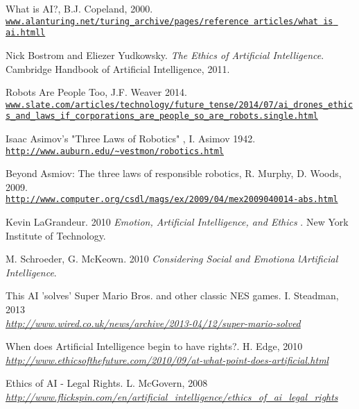 \documentclass[article]{IEEEtran}
\begin{document}
\begin{thebibliography}{9}

What is AI?, B.J. Copeland, 2000.
\\\texttt{\url{www.alanturing.net/turing_archive/pages/reference articles/what is ai.htmll}}

Nick Bostrom and Eliezer Yudkowsky. 
\textit{The Ethics of Artificial Intelligence}. 
Cambridge Handbook of Artificial Intelligence, 2011.

Robots Are People Too, J.F. Weaver 2014.
\\\texttt{\url{www.slate.com/articles/technology/future_tense/2014/07/ai_drones_ethics_and_laws_if_corporations_are_people_so_are_robots.single.html}}

Isaac Asimov's "Three Laws of Robotics" , I. Asimov 1942.
\\\texttt{\url{http://www.auburn.edu/~vestmon/robotics.html}}

Beyond Asmiov: The three laws of responsible robotics, R. Murphy, D. Woods, 2009.
\\\texttt{\url{http://www.computer.org/csdl/mags/ex/2009/04/mex2009040014-abs.html}}

Kevin LaGrandeur. 2010
\textit{Emotion, Artificial Intelligence, and Ethics }. 
New York Institute of Technology.

M. Schroeder, G. McKeown. 2010
\textit{Considering Social and Emotiona lArtiﬁcial Intelligence}.

This AI 'solves' Super Mario Bros. and other classic NES games. I. Steadman, 2013
\\\textit{\url{ http://www.wired.co.uk/news/archive/2013-04/12/super-mario-solved}}

When does Artificial Intelligence begin to have rights?. H. Edge, 2010
\\\textit{\url{ http://www.ethicsofthefuture.com/2010/09/at-what-point-does-artificial.html}}

Ethics of AI - Legal Rights. L. McGovern, 2008
\\\textit{\url{http://www.flickspin.com/en/artificial_intelligence/ethics_of_ai_legal_rights}}


\end{thebibliography}
\end{document}
